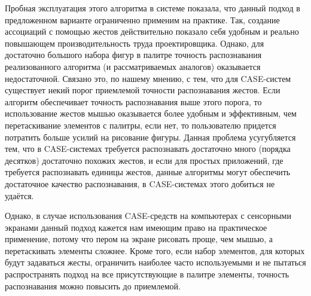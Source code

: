 \documentclass[a5paper]{article}
\begin{document}
Пробная эксплуатация этого алгоритма в системе показала, что 
данный подход в предложенном варианте ограниченно применим на практике. Так, создание ассоциаций с помощью жестов действительно
показало себя удобным и реально повышающем производительность труда проектировщика. Однако, для достаточно большого набора фигур 
в палитре точность распознавания реализованного алгоритма (и рассматриваемых аналогов) оказывается недостаточной. 
Связано это, по нашему мнению, с тем, что для CASE-систем существует некий порог приемлемой точности распознавания жестов. Если
алгоритм обеспечивает точность распознавания выше этого порога, то использование жестов мышью оказывается более удобным и эффективным,
чем перетаскивание элементов с палитры, если нет, то пользователю придется потратить больше усилий на рисование фигуры.
Данная проблема усугубляется тем, что в CASE-системах требуется распознавать достаточно много (порядка десятков) достаточно 
похожих жестов, и если для простых приложений, где требуется распознавать единицы жестов, данные алгоритмы могут обеспечить
достаточное качество распознавания, в CASE-системах этого добиться не удаётся.

Однако, в случае использования CASE-средств на компьютерах с сенсорными экранами данный подход кажется нам имеющим право на 
практическое применение, потому что пером на экране рисовать проще, чем мышью, а перетаскивать элементы сложнее. Кроме того, если набор элементов,
для которых будут задаваться жесты, ограничить наиболее часто используемыми и не пытаться распространять подход на все 
присутствующие в палитре элементы, точность распознавания можно повысить до приемлемой.

\pagebreak
\end{document}

